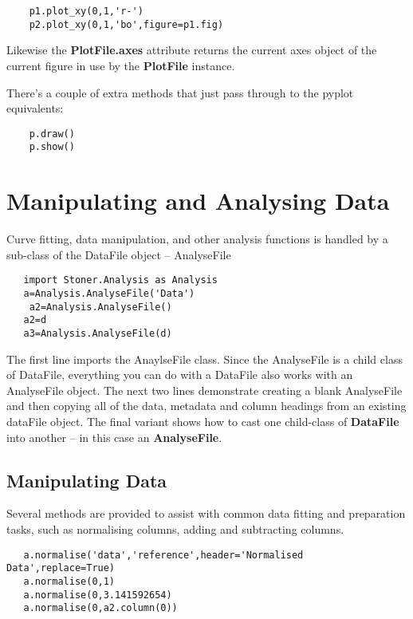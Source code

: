 \documentclass[a4paper,11pt]{scrartcl}
\begin{document}
 \begin{lstlisting}
    p1.plot_xy(0,1,'r-')
    p2.plot_xy(0,1,'bo',figure=p1.fig)
 \end{lstlisting}

 Likewise the \textbf{PlotFile.axes} attribute returns the current axes object of the current figure in use by the \textbf{PlotFile} instance.

 There's a couple of extra methods that just pass through to the pyplot equivalents:

 \begin{lstlisting}
    p.draw()
    p.show()
 \end{lstlisting}



\section{Manipulating and Analysing Data}

Curve fitting, data manipulation, and other analysis functions  is handled by a sub-class of the DataFile object -- AnalyseFile

\begin{lstlisting}
   import Stoner.Analysis as Analysis
   a=Analysis.AnalyseFile('Data')
    a2=Analysis.AnalyseFile()
   a2=d
   a3=Analysis.AnalyseFile(d)
\end{lstlisting}

The first line imports the AnaylseFile class. Since the AnalyseFile is a child
class of DataFile, everything you can do with a DataFile also works with an
AnalyseFile object. The next two lines demonstrate creating a blank AnalyseFile
and then copying all of the data, metadata and column headings from an existing
dataFile object. The final variant shows how to cast one child-class of \textbf{DataFile} into another -- in this case an \textbf{AnalyseFile}.

\subsection{Manipulating Data}

Several methods are provided to assist with common data fitting and preparation tasks, such as normalising columns, adding and subtracting columns.

\begin{lstlisting}
   a.normalise('data','reference',header='Normalised Data',replace=True)
   a.normalise(0,1)
   a.normalise(0,3.141592654)
   a.normalise(0,a2.column(0))
\end{lstlisting}
\end{document}
